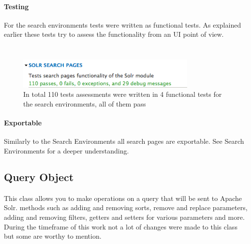 \inputminted[fontsize=\scriptsize,linenos]{php}{./code_examples/functions_search_pages.php}

\paragraph{Testing}
For the search environments tests were written as functional tests. As explained earlier these tests try to assess the functionality from an UI point of view.
\inputminted[fontsize=\scriptsize,linenos]{php}{./code_examples/testEditSearchPages.php}

\inputminted[fontsize=\scriptsize,linenos]{php}{./code_examples/test_signature_search_pages.php}

\begin{figure}[H]
     \includegraphics[width=0.8\textwidth]{images/implementation/test_search_pages.png}
     \caption{In total 110 tests assessments were written in 4 functional tests for the search environments, all of them pass}
\end{figure}

\paragraph{Exportable}
Similarly to the Search Environments all search pages are exportable. See Search Environments for a deeper understanding.

\subsection{Query Object}
\paragraph{} This class allows you to make operations on a query that will be sent to Apache Solr. methods such as adding and removing sorts, remove and replace parameters, adding and removing filters, getters and setters for various parameters and more. During the timeframe of this work not a lot of changes were made to this class but some are worthy to mention.

